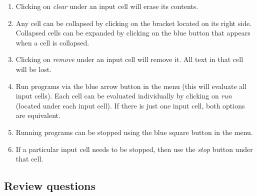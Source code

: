 \documentclass[article,A4,12pt]{llncs}
\begin{document}
{{{{\begin{enumerate}
\item Clicking on {\em clear} under an input cell will erase its contents.
\item Any cell can be collapsed by clicking on the bracket located on its right side. Collapsed
      cells can be expanded by clicking on the blue button that appears when a cell is 
      collapsed.
\item Clicking on {\em remove} under an input cell will remove it. All text in that cell will be lost.
\item Run programs via the blue arrow button in the menu (this will evaluate all input
      cells). Each cell can be evaluated individually by clicking on {\em run} (located under 
      each input cell). If there is just one input cell, both options are equivalent.
\item Running programs can be stopped using the blue square button in the menu. 
\item If a particular
      input cell needs to be stopped, then use the {\em stop} button under that cell.
\end{enumerate}

\subsection{Review questions}

}}}}
\end{document}
